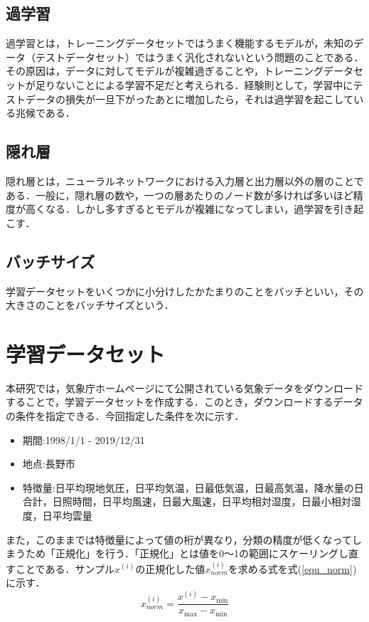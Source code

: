 \documentclass[a4j, 9pt, twocolumn, twoside]{jsarticle}
\begin{document}
	\subsection{過学習}
		過学習とは，トレーニングデータセットではうまく機能するモデルが，未知のデータ（テストデータセット）ではうまく汎化されないという問題のことである．その原因は，データに対してモデルが複雑過ぎることや，トレーニングデータセットが足りないことによる学習不足だと考えられる．経験則として，学習中にテストデータの損失が一旦下がったあとに増加したら，それは過学習を起こしている兆候である．\cite{oreilly}
	\subsection{隠れ層}
		隠れ層とは，ニューラルネットワークにおける入力層と出力層以外の層のことである．一般に，隠れ層の数や，一つの層あたりのノード数が多ければ多いほど精度が高くなる．しかし多すぎるとモデルが複雑になってしまい，過学習を引き起こす．
	\subsection{バッチサイズ}
		学習データセットをいくつかに小分けしたかたまりのことをバッチといい，その大きさのことをバッチサイズという．

\section{学習データセット}
	本研究では，気象庁ホームページにて公開されている気象データをダウンロードすることで，学習データセットを作成する．このとき，ダウンロードするデータの条件を指定できる．今回指定した条件を次に示す．
	\begin{itemize}
		\item 期間:1998/1/1 - 2019/12/31
		\item 地点:長野市
		\item 特徴量:日平均現地気圧，日平均気温，日最低気温，日最高気温，降水量の日合計，日照時間，日平均風速，日最大風速，日平均相対湿度，日最小相対湿度，日平均雲量
	\end{itemize}

	また，このままでは特徴量によって値の桁が異なり，分類の精度が低くなってしまうため「正規化」を行う．「正規化」とは値を0〜1の範囲にスケーリングし直すことである．サンプル$x^{\left( i\right) }$の正規化した値$x^{\left( i\right) }_{norm}$を求める式を式(\ref{equ_norm})に示す．
	\begin{equation}\label{equ_norm}
		x^{\left( i\right) }_{norm}=\dfrac {x^{\left( i\right) }-x_{\min }}{x_{\max }-x_{\min }}
	\end{equation}
\end{document}
